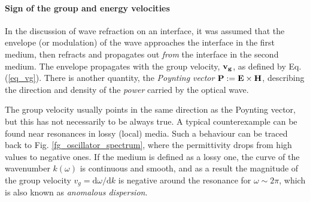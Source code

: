 \paragraph{Sign of the group and energy velocities}  %
In the discussion of wave refraction on an interface, it was assumed that the envelope (or modulation) of the wave approaches the interface in the first medium, then refracts and propagates out \textit{from} the interface in the second medium. The envelope propagates with the group velocity, ${\mathbf{v_g}}$, as defined by Eq. (\ref{eq_vg}). There is another quantity, the \textit{Poynting vector} $\mathbf{P} := \mathbf{E}\times\mathbf{H}$, describing the direction and density of the \textit{power} carried by the optical wave. 

The group velocity usually points in the same direction as the Poynting vector, but this has not necessarily to be always true. A typical counterexample can be found near resonances in lossy (local) media. Such a behaviour can be traced back to Fig. \ref{fg_oscillator_spectrum}, where the permittivity drops from high values to negative ones. If the medium is defined as a lossy one, the curve of the wavenumber $k(\omega)$ is continuous and smooth, and as a result the magnitude of the group velocity $v_g = \mathrm{d}\omega / \mathrm{d}k$ is negative around the resonance for $\omega \sim 2\pi$, %
which is also known as \textit{anomalous dispersion}. 

